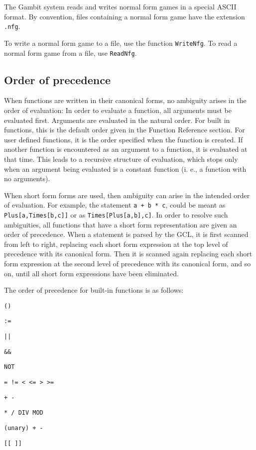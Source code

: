 The Gambit system reads and writes normal form games in a special ASCII
format.  By convention, files containing a normal form game have the extension
\verb+.nfg+.

To write a normal form game to a file, use the function \verb+WriteNfg+.
To read a normal form game from a file, use \verb+ReadNfg+.

\subsection{Order of precedence}

When functions are written in their canonical forms, no ambiguity
arises in the order of evaluation: In order to evaluate a function,
all arguments must be evaluated first.  Arguments are evaluated in the
natural order.  For built in functions, this is the default order
given in the Function Reference section.  For user defined functions,
it is the order specified when the function is created.  If another
function is encountered as an argument to a function, it is evaluated
at that time.  This leads to a recursive structure of evaluation,
which stops only when an argument being evaluated is a constant
function (i. e., a function with no arguments).

When short form forms are used, then ambiguity can arise in the
intended order of evaluation.  For example, the statement \verb&a + b * c&,
could be meant as \verb+Plus[a,Times[b,c]]+ or as
\verb+Times[Plus[a,b],c]+.  In order to resolve such ambiguities, all
functions that have a short form representation are given an order of
precedence.  When a statement is parsed by the GCL, it is first
scanned from left to right, replacing each short form expression at the
top level of precedence with its canonical form.  Then it is scanned
again replacing each short form expression at the second level of
precedence with its canonical form, and so on, until all short form
expressions have been eliminated.  

The order of precedence for built-in functions is as follows:
\bd
\item
\verb+()+
\item
\verb+:=+
\item
\verb+||+
\item
\verb+&&+
\item
\verb+NOT+
\item
\verb+= != < <= > >=+
\item
\verb&+ -&
\item
\verb+* / DIV MOD+
\item
\verb&(unary) + -&
\item
\verb+[[ ]]+
\ed

